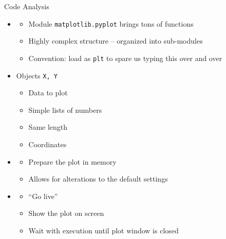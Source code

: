 
\begin{frame}[fragile]{Code Analysis}
%
\begin{itemize}
\item {}
	\begin{itemize}
	\item Module \texttt{matplotlib.pyplot} brings tons of functions
	\item Highly complex structure -- organized into sub-modules
	\item Convention: load as \texttt{plt} to spare us typing this over and over
	\end{itemize}
\item Objects \texttt{X, Y}
	\begin{itemize}
	\item Data to plot
	\item Simple lists of numbers
	\item Same length
	\item Coordinates
	\end{itemize}
\item {}
	\begin{itemize}
	\item Prepare the plot in memory
	\item Allows for alterations to the default settings
	\end{itemize}
\item {}
	\begin{itemize}
	\item \enquote{Go live}
	\item Show the plot on screen
	\item Wait with execution until plot window is closed
	\end{itemize}
\end{itemize}
%
\end{frame}


